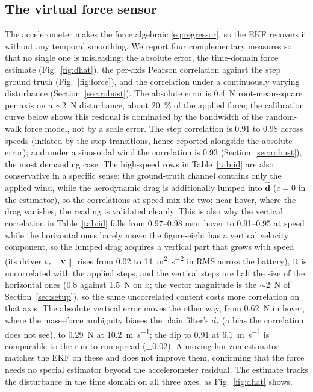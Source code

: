 \documentclass{ieeeaccess}
\newcommand{\norm}[1]{\left\| #1 \right\|}
\newcommand{\vect}[1]{\bm{#1}}
\begin{document}
\subsection{The virtual force sensor}
The accelerometer makes the force algebraic \eqref{eq:regressor}, so the EKF
recovers it without any temporal smoothing. We report four complementary
measures so that no single one is misleading: the absolute error, the time-domain
force estimate (Fig.~\ref{fig:dhat}), the per-axis Pearson correlation against the
step ground truth (Fig.~\ref{fig:force}), and the correlation under a continuously
varying disturbance (Section~\ref{sec:robust}).
The absolute error is \SI{0.4}{\newton} root-mean-square per axis on a
$\sim$\SI{2}{\newton} disturbance, about \SI{20}{\percent} of the applied force;
the calibration curve below shows this residual is dominated by the bandwidth of
the random-walk force model, not by a scale error. The step correlation is
\num{0.91} to \num{0.98} across speeds (inflated by the step transitions, hence
reported alongside the absolute error); and under a sinusoidal wind the
correlation is \num{0.93} (Section~\ref{sec:robust}), the most demanding case.
The high-speed rows in Table~\ref{tab:id} are also conservative in a specific
sense: the ground-truth
channel contains only the applied wind, while the aerodynamic drag is
additionally lumped into $\hat{\vect{d}}$ ($c{=}0$ in the estimator), so the correlations at
speed mix the two; near hover, where the drag vanishes, the reading is validated
cleanly. This is also why the vertical correlation in Table~\ref{tab:id} falls
from \numrange{0.97}{0.98} near hover to \numrange{0.91}{0.95} at speed while the horizontal
ones barely move: the figure-eight has a vertical velocity component, so the
lumped drag acquires a vertical part that grows with speed (its driver $v_z\norm{\vect{v}}$
rises from \SI{0.02}{} to \SI{14}{\meter\squared\per\second\squared} in RMS
across the battery), it is uncorrelated with the applied steps, and the vertical
steps are half the size of the horizontal ones (\SI{0.8}{} against
\SI{1.5}{\newton} on $x$; the vector magnitude is the $\sim$\SI{2}{\newton} of
Section~\ref{sec:setup}), so the same uncorrelated content costs more correlation on
that axis. The absolute vertical error moves the other way, from
\SI{0.62}{\newton} in hover, where the mass--force ambiguity biases the plain
filter's $d_z$ (a bias the correlation does not see), to \SI{0.29}{\newton} at
\SI{10.2}{\meter\per\second}; the dip to \num{0.91} at \SI{6.1}{\meter\per\second}
is comparable to the run-to-run spread ($\pm0.02$). A moving-horizon
estimator matches the EKF on these and does not improve them, confirming that the
force needs no special estimator beyond the accelerometer residual.
The estimate tracks the disturbance in the time domain on all three axes, as
Fig.~\ref{fig:dhat} shows.
\end{document}
